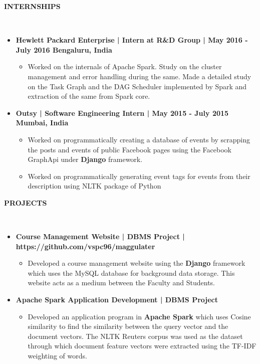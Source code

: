 \documentclass[a4paper,10pt]{article}
\newcommand{\isep}{-2 pt}
\newcommand{\lsep}{-0.5cm}
\newcommand{\resheading}[1]{{\small \colorbox{mygrey}{\begin{minipage}{0.975\textwidth}{\textbf{#1 \vphantom{p\^{E}}}}\end{minipage}}}}
\begin{document}
\resheading{\textbf{INTERNSHIPS} }\\[\lsep]
\begin{itemize}
\item \noindent \textbf{Hewlett Packard Enterprise | Intern at R\&D Group | May 2016 - July 2016 Bengaluru, India}
    \begin{itemize}\itemsep\isep
    \item {Worked on the internals of Apache Spark. Study on the cluster management and error handling during the same. Made a detailed study on the Task Graph and the DAG Scheduler implemented by Spark and extraction of the same from Spark core.
    }
    \end{itemize}
\item \noindent \textbf{Outsy | \textbf{Software Engineering Intern} | May 2015 - July 2015 Mumbai, India}
    \begin{itemize}\itemsep\isep
    \item {Worked on programmatically creating a database of events by scrapping the posts and events of public Facebook pages using the Facebook GraphApi under \textbf{Django} framework.
    }
    \item {Worked on programmatically generating event tags for events from their description using NLTK package of Python }
    \end{itemize}
\end{itemize}

\resheading{\textbf{PROJECTS} }\\[\lsep]
\begin{itemize}
\item \noindent \textbf{Course Management Website | DBMS Project |  https://github.com/vspc96/maggulater }
    \begin{itemize}\itemsep\isep
    \item {Developed a course management website using the \textbf{Django} framework which uses the MySQL database for background data storage. This website acts as a medium between the Faculty and Students. 
    }
    \end{itemize}
\item \noindent \textbf{Apache Spark Application Development | DBMS Project }
    \begin{itemize}\itemsep\isep
    \item {Developed an application program in \textbf{Apache Spark} which uses Cosine similarity to find the similarity between the query vector and the document vectors. The NLTK Reuters corpus was used as the dataset through which document feature vectors were extracted using the TF-IDF weighting of words.
    }
    \end{itemize}
\end{itemize}
\end{document}
